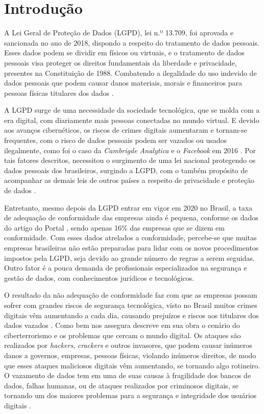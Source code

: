 \documentclass[
	12pt,				%
	openright,			%
	oneside,			%
	a4paper,			%
	english,			%
	french,				%
	spanish,			%
	brazil,				%
	]{abntex2}
\begin{document}
\chapter*{Introdução}
\label{chapter:introducao}
A Lei Geral de Proteção de Dados (LGPD), lei n.º 13.709, foi aprovada e sancionada no ano de 2018, dispondo a respeito do tratamento de dados pessoais. Esses dados podem se dividir em físicos ou virtuais, e o tratamento de dados pessoais visa proteger os direitos fundamentais da liberdade e privacidade, presentes na Constituição de 1988. Combatendo a ilegalidade do uso indevido de dados pessoais que podem causar danos materiais, morais e financeiros para pessoas físicas titulares dos dados \cite{01-01-LeiGeral}. 

A LGPD surge de uma necessidade da sociedade tecnológica, que se molda com a era digital, com diariamente mais pessoas conectadas no mundo virtual. E devido aos avanços cibernéticos, os riscos de crimes digitais aumentaram e tornam-se frequentes, com o risco de dados pessoais podem ser vazados ou usados ilegalmente, como foi o caso da \textit{Cambrigde Analytica} e o \textit{Facebook} em 2016 \cite{01-03-OlharDigital}. Por tais fatores descritos, necessitou o surgimento de uma lei nacional protegendo os dados pessoais dos brasileiros, surgindo a LGPD, com o também propósito de acompanhar as demais leis de outros países a respeito de privacidade e proteção de dados \cite{01-02-Senado}.

Entretanto, mesmo depois da LGPD entrar em vigor em 2020 no Brasil, a taxa de adequação de conformidade das empresas ainda é pequena, conforme os dados do artigo do Portal , sendo apenas 16\% das empresas que se dizem em conformidade. Com esses dados atrelados a conformidade, percebe-se que muitas empresas brasileiras não estão preparadas para lidar com os novos procedimentos impostos pela LGPD, seja devido ao grande número de regras a serem seguidas. Outro fator é a pouca demanda de profissionais especializados na segurança e gestão de dados, com conhecimentos jurídicos e tecnológicos. 

O resultado da não adequação de conformidade faz com que as empresas possam sofrer com grandes riscos de segurança tecnológica, visto no Brasil muitos crimes digitais vêm aumentando a cada dia, causando prejuízos e riscos aos titulares dos dados vazados \cite{Diogo2021}. 
Como bem nos assegura  descreve em sua obra o cenário do ciberterrorismo e os problemas que cercam o mundo digital. Os ataques são realizados por \textit{hackers}, \textit{crackers} e outros invasores, que podem causar inúmeros danos a governos, empresas, pessoas físicas, violando inúmeros direitos, de modo que esses ataques maliciosos digitais vêm aumentando, se tornando algo rotineiro. 
O vazamento de dados tem em uma de suas causas à fragilidade dos bancos de dados, falhas humanas, ou de ataques realizados por criminosos digitais, se tornando um dos maiores problemas para a segurança e integridade dos usuários digitais \cite{01-06-Dodsworth2021}.
\end{document}
